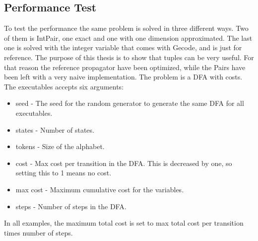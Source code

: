 \documentclass[a4paper,11pt]{article}
\begin{document}
\subsection{Performance Test}
To test the performance the same problem is solved in three different ways. Two of them is IntPair, one exact and one with one dimension approximated. The last one is solved with the integer variable that comes with Gecode, and is just for reference. The purpose of this thesis is to show that tuples can be very useful. For that reason the reference propagator have been optimized, while the Pairs have been left with a very naive implementation. The problem is a DFA with costs. The executables accepts six arguments: 
\begin{itemize}
\item{seed} - The seed for the random generator to generate the same DFA for all executables.
\item{states} - Number of states.
\item{tokens} - Size of the alphabet.
\item{cost} - Max cost per transition in the DFA. This is decreased by one, so setting this to 1 means no cost.
\item{max cost} - Maximum cumulative cost for the variables.
\item{steps} - Number of steps in the DFA.
\end{itemize}
In all examples, the maximum total cost is set to max total cost per transition times number of steps.
\end{document}
